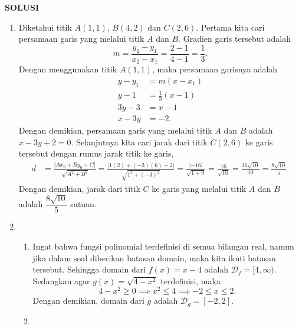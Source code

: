 \documentclass[11pt,openany,a4paper]{article}
\renewcommand{\headrulewidth}{0pt}
\begin{document}
\newpage
\fancyfoot{}
{\centering\textbf{SOLUSI}}
\renewcommand{\arraystretch}{1.5}
\renewcommand{\headrulewidth}{1pt}
\begin{enumerate}
    \item Diketahui titik $A(1,1)$, $B(4,2)$ dan $C(2,6)$. Pertama kita cari persamaan garis yang melalui titik $A$ dan $B$. Gradien garis tersebut adalah
          \[
              m = \frac{y_2 - y_1}{x_2 - x_1} = \frac{2 - 1}{4 - 1} = \frac{1}{3}.
          \]
          Dengan menggunakan titik $A(1,1)$, maka persamaan garisnya adalah
          \begin{align*}
              y - y_1 & = m(x - x_1)         \\
              y - 1   & = \frac{1}{3}(x - 1) \\
              3y - 3  & = x - 1              \\
              x - 3y  & = -2.
          \end{align*}
          Dengan demikian, persamaan garis yang melalui titik $A$ dan $B$ adalah $x - 3y + 2 = 0$. Selanjutnya kita cari jarak dari titik $C(2,6)$ ke garis tersebut dengan rumus jarak titik ke garis,
          \begin{align*}
              d & = \frac{|Ax_0 + By_0 + C|}{\sqrt{A^2 + B^2}}       = \frac{|1(2) + (-3)(6) + 2|}{\sqrt{1^2 + (-3)^2}} = \frac{|-16|}{\sqrt{1 + 9}} = \frac{16}{\sqrt{10}}                             = \frac{16\sqrt{10}}{10}                            = \frac{8\sqrt{10}}{5}.
          \end{align*}
          Dengan demikian, jarak dari titik $C$ ke garis yang melalui titik $A$ dan $B$ adalah $\dfrac{8\sqrt{10}}{5}$ satuan.
    \item \begin{enumerate}
              \item Ingat bahwa fungsi polinomial terdefinisi di semua bilangan real, namun jika dalam soal diberikan batasan domain, maka kita ikuti batasan tersebut. Sehingga domain dari $f(x) = x - 4$ adalah $\mathcal{D}_f = [4,\infty)$. Sedangkan agar $g(x) = \sqrt{4 - x^2}$ terdefinisi, maka
                    \[
                        4 - x^2 \geq 0 \implies x^2 \leq 4 \implies -2 \leq x \leq 2.
                    \]
                    Dengan demikian, domain dari $g$ adalah $\mathcal{D}_g = [-2,2]$.
              \item \begin{align*}

\end{align*}
\end{enumerate}
\end{enumerate}
\end{document}
